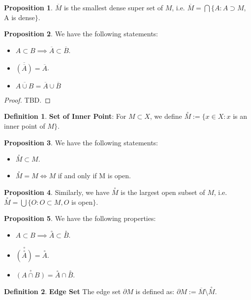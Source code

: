 \documentclass{article}
\theoremstyle{definition}
\newtheorem{defi}{Definition}[subsection]
\newtheorem{prop}{Proposition}[subsection]
\begin{document}
\begin{prop}
$\overline{M}$ is the smallest dense super set of $M$, i.e. $\overline{M}=\bigcap\{A: A\supset M$, A is dense$\}$.
\end{prop}
\begin{prop}
We have the following statements:
\begin{itemize}
    \item $A \subset B \implies \overline{A}\subset \overline{B}$.
    \item $\overline{(\overline{A})}=\overline{A}$.
    \item $\overline{A\cup B}=\overline{A}\cup \overline{B}$
\end{itemize}
\begin{proof}
TBD.
\end{proof}
\end{prop}
\begin{defi}
\textbf{Set of Inner Point}: For $M\subset X$, we define $\overset{\circ}{M}:= \{x\in X: x$ is an inner point of  $M\}$.
\end{defi}
\begin{prop}
We have the following statements:
\begin{itemize}
    \item $\overset{\circ}{M}\subset M$.
    \item $\overset{\circ}{M}=M\Leftrightarrow M$ if and only if M is open. 
\end{itemize}
\end{prop}
\begin{prop}
Similarly, we have $\overset{\circ}{M}$ is the largest open subset of $M$, i.e. $\overset{\circ}{M}=\bigcup \{O:O\subset M, O $ is open$\}$.
\end{prop}
\begin{prop}
We have the following properties:
\begin{itemize}
    \item $A \subset B \implies \overset{\circ}{A}\subset \overset{\circ}{B}$.
    \item $\overset{\circ}{(\overset{\circ}{A})} = \overset{\circ}{A}$.
    \item $\overset{\circ}{(A\cap B)}=\overset{\circ}{A}\cap \overset{\circ}{B}$.
\end{itemize}
\end{prop}
\begin{defi}
\textbf{Edge Set} The edge set $\partial M$ is defined as: $\partial M:= \overline{M} \texttt{\textbackslash}\overset{\circ}{M}$.
\end{defi}
\end{document}

